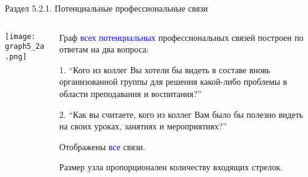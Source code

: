 \begin{frame}{Раздел 5.2.1. Потенциальные профессиональные связи}

\begin{columns}
\begin{column}{0.75\textwidth} 
\centering
          \texttt{[image: graph5\_2a.png]}
\end{column}
\begin{column}{0.25\textwidth} 

\tiny
Граф \textcolor{blue}{всех потенциальных} профессиональных связей построен по ответам на два вопроса:
\smallskip

1. ``Кого из коллег Вы хотели бы видеть в составе вновь организованной группы для решения какой-либо проблемы в области преподавания и воспитания?''
\smallskip

2. ``Как вы считаете, кого из коллег Вам было бы полезно видеть на своих уроках, занятиях и мероприятиях?''
\smallskip

Отображены \textcolor{blue}{все} связи. 
\smallskip

Размер узла пропорционален количеству входящих стрелок.

\end{column}
\end{columns}
\end{frame}


